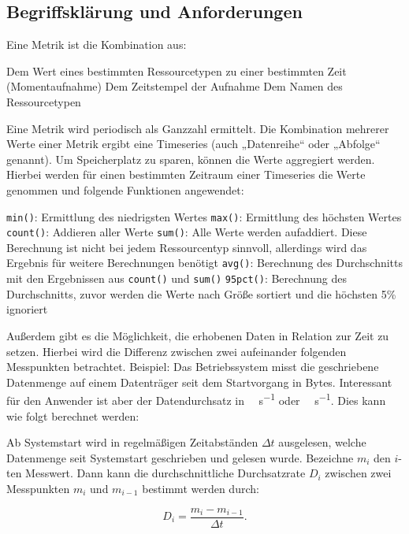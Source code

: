 \subsection{Begriffsklärung und Anforderungen}
\label{section:Begriffserklärung}
Eine Metrik ist die Kombination aus:

\begin{outline}
  \1 Dem Wert eines bestimmten Ressourcetypen zu einer bestimmten Zeit
  (Momentaufnahme)
  \1 Dem Zeitstempel der Aufnahme
  \1 Dem Namen des Ressourcetypen
\end{outline}

Eine Metrik wird periodisch als Ganzzahl ermittelt. Die Kombination mehrerer
Werte einer Metrik ergibt eine Timeseries (auch „Datenreihe“ oder „Abfolge“
genannt). Um Speicherplatz zu sparen, können die Werte aggregiert werden.
Hierbei werden für einen bestimmten Zeitraum einer Timeseries die Werte
genommen und folgende Funktionen angewendet:

\begin{outline}
  \1 \lstinline|min()|: Ermittlung des niedrigsten Wertes
  \1 \lstinline|max()|: Ermittlung des höchsten Wertes
  \1 \lstinline|count()|: Addieren aller Werte
  \1 \lstinline|sum()|: Alle Werte werden aufaddiert. Diese Berechnung ist
  nicht bei jedem Ressourcentyp sinnvoll, allerdings wird das Ergebnis für
  weitere Berechnungen benötigt
  \1 \lstinline|avg()|: Berechnung des Durchschnitts mit den Ergebnissen aus
  \lstinline|count()| und \mbox{\lstinline|sum()|}
  \1 \lstinline|95pct()|: Berechnung des Durchschnitts, zuvor werden die Werte
  nach Größe sortiert und die höchsten 5\% ignoriert
\end{outline}

Außerdem gibt es die Möglichkeit, die erhobenen Daten in Relation zur Zeit zu
setzen. Hierbei wird die Differenz zwischen zwei aufeinander folgenden
Messpunkten betrachtet. Beispiel: Das Betriebssystem misst die geschriebene
Datenmenge auf einem Datenträger seit dem Startvorgang in Bytes. Interessant
für den Anwender ist aber der Datendurchsatz in \si{\mega\byte\per\second} oder
\si{\giga\byte\per\second}. Dies kann wie folgt berechnet werden:

Ab Systemstart wird in regelmäßigen Zeitabständen $\Delta t$ ausgelesen, welche
Datenmenge seit Systemstart geschrieben und gelesen wurde. Bezeichne $m_i$ den
$i$-ten Messwert. Dann kann die durchschnittliche Durchsatzrate $D_i$ zwischen
zwei Messpunkten $m_i$ und $m_{i-1}$ bestimmt werden durch:

\[ D_i = \frac{m_{i} - m_{i-1}}{\Delta t}.\]

